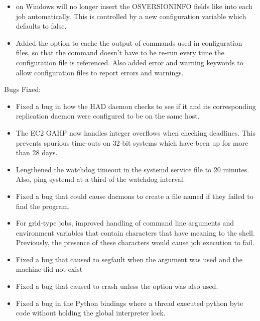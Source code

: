 \begin{itemize}
\item {} on Windows will no longer insert the OSVERSIONINFO
fields like  into each job automatically. This
is controlled by a new configuration variable 
which defaults to false.

\item Added the option to cache the output of commands used in configuration
files, so that the command doesn't have to be re-run every time the
configuration file is referenced.  Also added error and warning keywords
to allow configuration files to report errors and warnings.

\end{itemize}

\noindent Bugs Fixed:

\begin{itemize}

\item Fixed a bug in how the HAD daemon checks to see if it and its
corresponding replication daemon were configured to be on the same host.

\item The EC2 GAHP now handles integer overflows when checking deadlines.
This prevents spurious time-outs on 32-bit systems which have been up for
more than 28 days.

\item Lengthened the watchdog timeout in the systemd service file to 20 minutes.
Also, ping systemd at a third of the watchdog interval.

\item Fixed a bug that could cause daemons to create a file named
 if they failed to find the 
program.

\item For grid-type  jobs, improved handling of command
line arguments and environment variables that contain characters that
have meaning to the shell.
Previously, the presence of these characters would cause job execution
to fail.

\item Fixed a bug that caused  to segfault when the 
argument was used and the machine did not exist

\item Fixed a bug that caused   to crash unless the 
option was also used.

\item Fixed a bug in the Python bindings where a thread executed python
byte code without holding the global interpreter lock.

\end{itemize}

